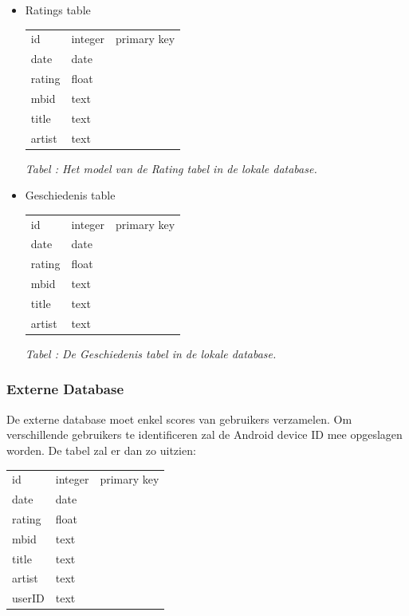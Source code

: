 \documentclass[11pt,a4paper]{article}
\newcounter{tabc}
\newcommand{\tabID} {%
   \stepcounter{tabc}%
   \thetabc}
\begin{document}
	 \begin{itemize}
		\item Ratings table \newline
		\begin{tabular}{| l | l | l | }
		\hline
		id & integer & primary key \\
		date & date & \\
		rating & float & \\
		mbid & text & \\
		title & text & \\
		artist & text & \\
		\hline
		\end{tabular}
		
	\small \textit{Tabel \tabID : Het model van de Rating tabel in de lokale database.} \\ \normalsize
	
		\item Geschiedenis table \newline
		\begin{tabular}{| l | l | l | }
		\hline
		 id & integer & primary key \\
		date & date & \\
		rating & float & \\
		mbid & text & \\
		title & text & \\
		artist & text & \\
		\hline
		\end{tabular}
	
	\small \textit{Tabel \tabID : De Geschiedenis tabel in de lokale database.} \\ \normalsize
	
	 \end{itemize}
	

	\subsubsection{Externe Database}
	De externe database moet enkel scores van gebruikers verzamelen. Om verschillende gebruikers te identificeren zal de Android device ID mee opgeslagen worden. De tabel zal er dan zo uitzien: \\ \newline
		\begin{tabular}{| l | l | l | }
		\hline
		 id & integer & primary key \\
		date & date & \\
		rating & float & \\
		mbid & text & \\
		title & text & \\
		artist & text & \\
		userID & text & \\
		\hline
		\end{tabular}
	
\end{document}
